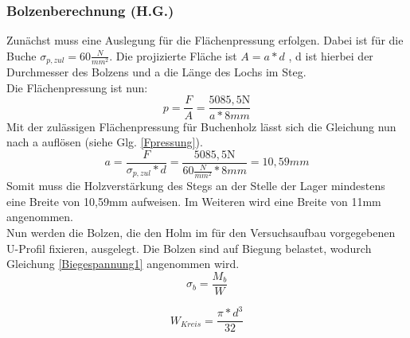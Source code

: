 

\subsubsection{Bolzenberechnung (H.G.)} \label{Bolzenberechnung}
Zunächst muss eine Auslegung für die Flächenpressung erfolgen. Dabei ist für die Buche $\sigma_{p,zul}=60\frac{N}{mm^2}$.
Die projizierte Fläche ist $A=a*d$ , d ist hierbei der Durchmesser des Bolzens und a die Länge des Lochs im Steg.\\
\noindent
Die Flächenpressung ist nun: 
\begin{equation}
	p=\frac{F}{A}=\frac{5085,5\mathrm{N}}{a*8mm}
\end{equation}
Mit der zulässigen Flächenpressung für Buchenholz lässt sich die Gleichung nun nach a auflösen (siehe Glg. \ref{Fpressung}).
\begin{equation}
\label{Fpressung}
	a=\frac{F}{\sigma_{p,zul}*d}=\frac{5085,5\mathrm{N}}{60\frac{N}{mm^{2}}*8mm}=10,59mm
\end{equation}
Somit muss die Holzverstärkung des Stegs an der Stelle der Lager mindestens eine Breite von 10,59$\mathrm{mm}$ aufweisen. Im Weiteren wird eine Breite von 11$\mathrm{mm}$ angenommen.\\
\noindent
Nun werden die Bolzen, die den Holm im für den Versuchsaufbau vorgegebenen U-Profil fixieren, ausgelegt. Die Bolzen sind auf Biegung belastet, wodurch Gleichung \ref{Biegespannung1} angenommen wird.
\begin{equation}
\label{Biegespannung1}
	\sigma_{b}=\frac{M_{b}}{W} 
\end{equation}
 
 \begin{equation}
 \label{WKreis}
 	W_{Kreis}=\frac{\pi*d^{3}}{32}
 \end{equation}
  
